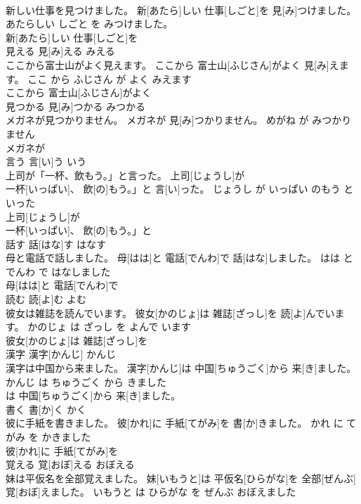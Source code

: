\documentclass[8pt]{extreport}
\begin{document}
\begin{CJK}{UTF8}{min}
\\	新しい仕事を見つけました。	新[あたら]しい 仕事[しごと]を 見[み]つけました。	あたらしい しごと を みつけました。	
\\	新[あたら]しい 仕事[しごと]を
\\	見える	見[み]える	みえる	
\\	ここから富士山がよく見えます。	ここから 富士山[ふじさん]がよく 見[み]えます。	ここ から ふじさん が よく みえます	
\\	ここから 富士山[ふじさん]がよく
\\	見つかる	見[み]つかる	みつかる	
\\	メガネが見つかりません。	メガネが 見[み]つかりません。	めがね が みつかりません	
\\	メガネが
\\	言う	言[い]う	いう	
\\	上司が「一杯、飲もう。」と言った。	上司[じょうし]が
\\	一杯[いっぱい]、 飲[の]もう。」と 言[い]った。	じょうし が いっぱい のもう と いった	
\\	上司[じょうし]が
\\	一杯[いっぱい]、 飲[の]もう。」と
\\	話す	話[はな]す	はなす	
\\	母と電話で話しました。	母[はは]と 電話[でんわ]で 話[はな]しました。	はは と でんわ で はなしました	
\\	母[はは]と 電話[でんわ]で
\\	読む	読[よ]む	よむ	
\\	彼女は雑誌を読んでいます。	彼女[かのじょ]は 雑誌[ざっし]を 読[よ]んでいます。	かのじょ は ざっし を よんで います	
\\	彼女[かのじょ]は 雑誌[ざっし]を
\\	漢字	漢字[かんじ]	かんじ	
\\	漢字は中国から来ました。	漢字[かんじ]は 中国[ちゅうごく]から 来[き]ました。	かんじ は ちゅうごく から きました	
\\	は 中国[ちゅうごく]から 来[き]ました。		
\\	書く	書[か]く	かく	
\\	彼に手紙を書きました。	彼[かれ]に 手紙[てがみ]を 書[か]きました。	かれ に てがみ を かきました	
\\	彼[かれ]に 手紙[てがみ]を
\\	覚える	覚[おぼ]える	おぼえる	
\\	妹は平仮名を全部覚えました。	妹[いもうと]は 平仮名[ひらがな]を 全部[ぜんぶ] 覚[おぼ]えました。	いもうと は ひらがな を ぜんぶ おぼえました	

\end{CJK}
\end{document}
